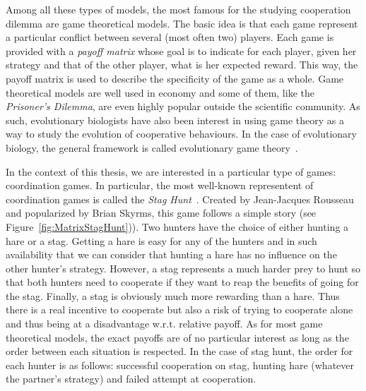     Among all these types of models, the most famous for the studying cooperation dilemma are game theoretical models. The basic idea is that each game represent a particular conflict between several (most often two) players. Each game is provided with a \emph{payoff matrix} whose goal is to indicate for each player, given her strategy and that of the other player, what is her expected reward. This way, the payoff matrix is used to describe the specificity of the game as a whole. Game theoretical models are well used in economy and some of them, like the \emph{Prisoner's Dilemma}, are even highly popular outside the scientific community. As such, evolutionary biologists have also been interest in using game theory as a way to study the evolution of cooperative behaviours. In the case of evolutionary biology, the general framework is called evolutionary game theory~\parencite{MaynardSmith1973}.

    In the context of this thesis, we are interested in a particular type of games: coordination games. In particular, the most well-known representent of coordination games is called the \emph{Stag Hunt}~\parencite{Skyrms2004}. Created by Jean-Jacques Rousseau and popularized by Brian Skyrms, this game follows a simple story (see Figure~\ref{fig:MatrixStagHunt})). Two hunters have the choice of either hunting a hare or a stag. Getting a hare is easy for any of the hunters and in such availability that we can consider that hunting a hare has no influence on the other hunter's strategy. However, a stag represents a much harder prey to hunt so that both hunters need to cooperate if they want to reap the benefits of going for the stag. Finally, a stag is obviously much more rewarding than a hare. Thus there is a real incentive to cooperate but also a risk of trying to cooperate alone and thus being at a disadvantage w.r.t. relative payoff. As for most game theoretical models, the exact payoffs are of no particular interest as long as the order between each situation is respected. In the case of stag hunt, the order for each hunter is as follows: successful cooperation on stag, hunting hare (whatever the partner's strategy) and failed attempt at cooperation.

